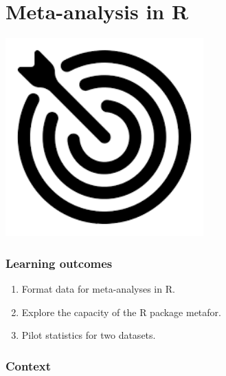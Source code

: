 \documentclass[
]{book}
\providecommand{\tightlist}{%
  \setlength{\itemsep}{0pt}\setlength{\parskip}{0pt}}
\begin{document}
\hypertarget{meta}{%
\chapter{Meta-analysis in R}\label{meta}}

\includegraphics[width=3in,height=\textheight]{./meta.png}

\hypertarget{learning-outcomes-3}{%
\subsection*{Learning outcomes}\label{learning-outcomes-3}}

\begin{enumerate}
\def\labelenumi{\arabic{enumi}.}
\tightlist
\item
  Format data for meta-analyses in R.\\
\item
  Explore the capacity of the R package metafor.\\
\item
  Pilot statistics for two datasets.
\end{enumerate}

\hypertarget{context-2}{%
\subsection*{Context}\label{context-2}}
\end{document}
